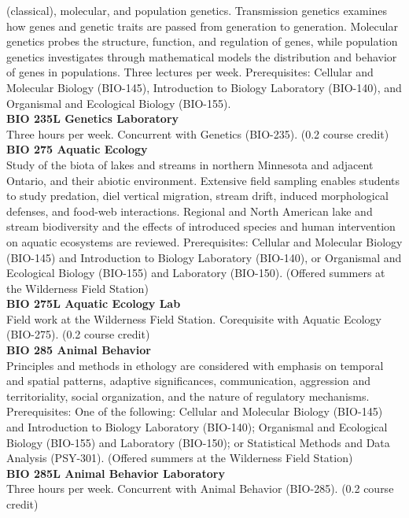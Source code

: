 \documentclass[
  letterpaper,
]{scrbook}
\begin{document}
(classical), molecular, and population genetics. Transmission genetics
examines how genes and genetic traits are passed from generation to
generation. Molecular genetics probes the structure, function, and
regulation of genes, while population genetics investigates through
mathematical models the distribution and behavior of genes in
populations. Three lectures per week. Prerequisites: Cellular and
Molecular Biology (BIO-145), Introduction to Biology Laboratory
(BIO-140), and Organismal and Ecological Biology (BIO-155).\\
\textbf{BIO 235L Genetics Laboratory}\\
Three hours per week. Concurrent with Genetics (BIO-235). (0.2 course
credit)\\
\textbf{BIO 275 Aquatic Ecology}\\
Study of the biota of lakes and streams in northern Minnesota and
adjacent Ontario, and their abiotic environment. Extensive field
sampling enables students to study predation, diel vertical migration,
stream drift, induced morphological defenses, and food-web interactions.
Regional and North American lake and stream biodiversity and the effects
of introduced species and human intervention on aquatic ecosystems are
reviewed. Prerequisites: Cellular and Molecular Biology (BIO-145) and
Introduction to Biology Laboratory (BIO-140), or Organismal and
Ecological Biology (BIO-155) and Laboratory (BIO-150). (Offered summers
at the Wilderness Field Station)\\
\textbf{BIO 275L Aquatic Ecology Lab}\\
Field work at the Wilderness Field Station. Corequisite with Aquatic
Ecology (BIO-275). (0.2 course credit)\\
\textbf{BIO 285 Animal Behavior}\\
Principles and methods in ethology are considered with emphasis on
temporal and spatial patterns, adaptive significances, communication,
aggression and territoriality, social organization, and the nature of
regulatory mechanisms. Prerequisites: One of the following: Cellular and
Molecular Biology (BIO-145) and Introduction to Biology Laboratory
(BIO-140); Organismal and Ecological Biology (BIO-155) and Laboratory
(BIO-150); or Statistical Methods and Data Analysis (PSY-301). (Offered
summers at the Wilderness Field Station)\\
\textbf{BIO 285L Animal Behavior Laboratory}\\
Three hours per week. Concurrent with Animal Behavior (BIO-285). (0.2
course credit)\\
\end{document}
